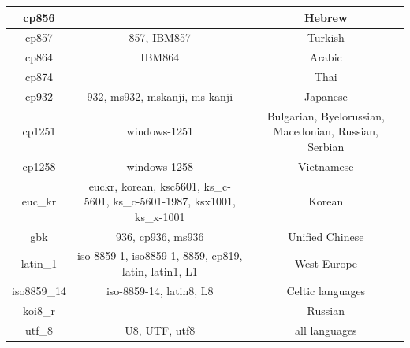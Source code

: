 \begin{center}
{\begin{tabular}{|c|c|c|}
            cp856             &                                                                          & Hebrew                                                \\\hline
            cp857             & 857, IBM857                                                              & Turkish                                               \\\hline
            cp864             & IBM864                                                                   & Arabic                                                \\\hline
            cp874             &                                                                          & Thai                                                  \\\hline
            cp932             & 932, ms932, mskanji, ms-kanji                                            & Japanese                                              \\\hline
            cp1251            & windows-1251                                                             & Bulgarian, Byelorussian, Macedonian, Russian, Serbian \\\hline
            cp1258            & windows-1258                                                             & Vietnamese                                            \\\hline
            euc\_kr           & euckr, korean, ksc5601, ks\_c-5601, ks\_c-5601-1987, ksx1001, ks\_x-1001 & Korean                                                \\\hline
            gbk               & 936, cp936, ms936                                                        & Unified Chinese                                       \\\hline
            latin\_1          & iso-8859-1, iso8859-1, 8859, cp819, latin, latin1, L1                    & West Europe                                           \\\hline
            iso8859\_14       & iso-8859-14, latin8, L8                                                  & Celtic languages                                      \\\hline
            koi8\_r           &                                                                          & Russian                                               \\\hline
            utf\_8            & U8, UTF, utf8                                                            & all languages                                         \\\hline
        \end{tabular}}
\end{center}

